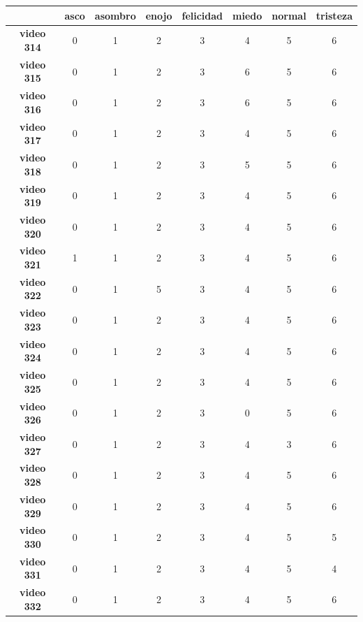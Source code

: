 \begin{table}[]
\centering
\begin{tabular}{c|c|c|c|c|c|c|c|}
\cline{2-8} 
\multicolumn{1}{l|}{} & \textbf{asco} & \textbf{asombro} & \textbf{enojo} & \textbf{felicidad} & \textbf{miedo} & \textbf{normal} & \textbf{tristeza} \\ \hline
\multicolumn{1}{|c|}{\textbf{video 314}} & 0 & 1 & 2 & 3 & 4 & 5 & 6 \\ \hline
\multicolumn{1}{|c|}{\textbf{video 315}} & 0 & 1 & 2 & 3 & 6 & 5 & 6 \\ \hline
\multicolumn{1}{|c|}{\textbf{video 316}} & 0 & 1 & 2 & 3 & 6 & 5 & 6 \\ \hline
\multicolumn{1}{|c|}{\textbf{video 317}} & 0 & 1 & 2 & 3 & 4 & 5 & 6 \\ \hline
\multicolumn{1}{|c|}{\textbf{video 318}} & 0 & 1 & 2 & 3 & 5 & 5 & 6 \\ \hline
\multicolumn{1}{|c|}{\textbf{video 319}} & 0 & 1 & 2 & 3 & 4 & 5 & 6 \\ \hline
\multicolumn{1}{|c|}{\textbf{video 320}} & 0 & 1 & 2 & 3 & 4 & 5 & 6 \\ \hline
\multicolumn{1}{|c|}{\textbf{video 321}} & 1 & 1 & 2 & 3 & 4 & 5 & 6 \\ \hline
\multicolumn{1}{|c|}{\textbf{video 322}} & 0 & 1 & 5 & 3 & 4 & 5 & 6 \\ \hline
\multicolumn{1}{|c|}{\textbf{video 323}} & 0 & 1 & 2 & 3 & 4 & 5 & 6 \\ \hline
\multicolumn{1}{|c|}{\textbf{video 324}} & 0 & 1 & 2 & 3 & 4 & 5 & 6 \\ \hline
\multicolumn{1}{|c|}{\textbf{video 325}} & 0 & 1 & 2 & 3 & 4 & 5 & 6 \\ \hline
\multicolumn{1}{|c|}{\textbf{video 326}} & 0 & 1 & 2 & 3 & 0 & 5 & 6 \\ \hline
\multicolumn{1}{|c|}{\textbf{video 327}} & 0 & 1 & 2 & 3 & 4 & 3 & 6 \\ \hline
\multicolumn{1}{|c|}{\textbf{video 328}} & 0 & 1 & 2 & 3 & 4 & 5 & 6 \\ \hline
\multicolumn{1}{|c|}{\textbf{video 329}} & 0 & 1 & 2 & 3 & 4 & 5 & 6 \\ \hline
\multicolumn{1}{|c|}{\textbf{video 330}} & 0 & 1 & 2 & 3 & 4 & 5 & 5 \\ \hline
\multicolumn{1}{|c|}{\textbf{video 331}} & 0 & 1 & 2 & 3 & 4 & 5 & 4 \\ \hline
\multicolumn{1}{|c|}{\textbf{video 332}} & 0 & 1 & 2 & 3 & 4 & 5 & 6 \\ \hline

\end{tabular}
\end{table}
